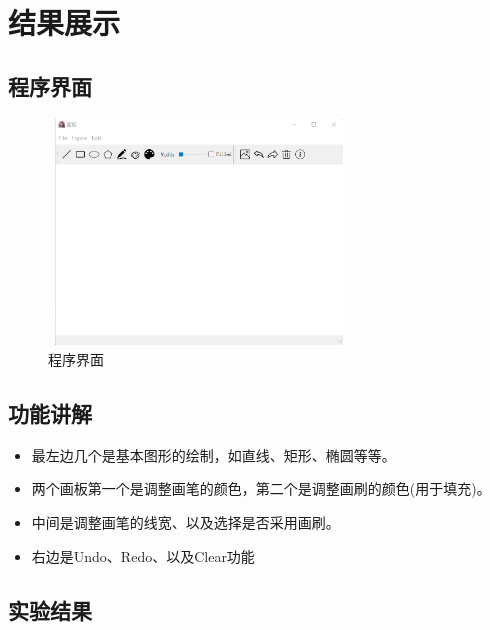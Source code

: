 \documentclass{article}
\begin{document}
	
	\section{结果展示}
	
	\subsection{程序界面}
	
		\begin{figure}[H]
		\begin{center}
			
			\includegraphics[width=8cm,height=6cm]{ui}
			\caption{程序界面} 
		\end{center}
	\end{figure}
	
		\subsection{功能讲解}
		
			\begin{itemize}
			\item 最左边几个是基本图形的绘制，如直线、矩形、椭圆等等。
		\end{itemize}
		\begin{itemize}
			\item 两个画板第一个是调整画笔的颜色，第二个是调整画刷的颜色(用于填充)。
		\end{itemize}
		\begin{itemize}
			\item 中间是调整画笔的线宽、以及选择是否采用画刷。
		\end{itemize}
		\begin{itemize}
			\item 右边是Undo、Redo、以及Clear功能
		\end{itemize}
	
		
			\subsection{实验结果}
	
\end{document}
